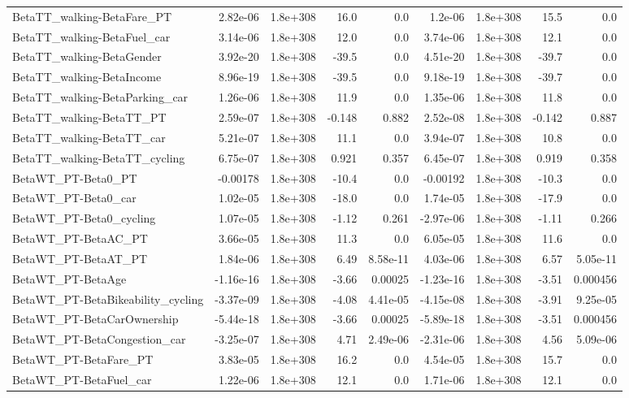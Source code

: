 \begin{tabular}{lrrrrrrrr}
BetaTT_walking-BetaFare_PT & 2.82e-06 & 1.8e+308 & 16.0 & 0.0 & 1.2e-06 & 1.8e+308 & 15.5 & 0.0 \\
BetaTT_walking-BetaFuel_car & 3.14e-06 & 1.8e+308 & 12.0 & 0.0 & 3.74e-06 & 1.8e+308 & 12.1 & 0.0 \\
BetaTT_walking-BetaGender & 3.92e-20 & 1.8e+308 & -39.5 & 0.0 & 4.51e-20 & 1.8e+308 & -39.7 & 0.0 \\
BetaTT_walking-BetaIncome & 8.96e-19 & 1.8e+308 & -39.5 & 0.0 & 9.18e-19 & 1.8e+308 & -39.7 & 0.0 \\
BetaTT_walking-BetaParking_car & 1.26e-06 & 1.8e+308 & 11.9 & 0.0 & 1.35e-06 & 1.8e+308 & 11.8 & 0.0 \\
BetaTT_walking-BetaTT_PT & 2.59e-07 & 1.8e+308 & -0.148 & 0.882 & 2.52e-08 & 1.8e+308 & -0.142 & 0.887 \\
BetaTT_walking-BetaTT_car & 5.21e-07 & 1.8e+308 & 11.1 & 0.0 & 3.94e-07 & 1.8e+308 & 10.8 & 0.0 \\
BetaTT_walking-BetaTT_cycling & 6.75e-07 & 1.8e+308 & 0.921 & 0.357 & 6.45e-07 & 1.8e+308 & 0.919 & 0.358 \\
BetaWT_PT-Beta0_PT & -0.00178 & 1.8e+308 & -10.4 & 0.0 & -0.00192 & 1.8e+308 & -10.3 & 0.0 \\
BetaWT_PT-Beta0_car & 1.02e-05 & 1.8e+308 & -18.0 & 0.0 & 1.74e-05 & 1.8e+308 & -17.9 & 0.0 \\
BetaWT_PT-Beta0_cycling & 1.07e-05 & 1.8e+308 & -1.12 & 0.261 & -2.97e-06 & 1.8e+308 & -1.11 & 0.266 \\
BetaWT_PT-BetaAC_PT & 3.66e-05 & 1.8e+308 & 11.3 & 0.0 & 6.05e-05 & 1.8e+308 & 11.6 & 0.0 \\
BetaWT_PT-BetaAT_PT & 1.84e-06 & 1.8e+308 & 6.49 & 8.58e-11 & 4.03e-06 & 1.8e+308 & 6.57 & 5.05e-11 \\
BetaWT_PT-BetaAge & -1.16e-16 & 1.8e+308 & -3.66 & 0.00025 & -1.23e-16 & 1.8e+308 & -3.51 & 0.000456 \\
BetaWT_PT-BetaBikeability_cycling & -3.37e-09 & 1.8e+308 & -4.08 & 4.41e-05 & -4.15e-08 & 1.8e+308 & -3.91 & 9.25e-05 \\
BetaWT_PT-BetaCarOwnership & -5.44e-18 & 1.8e+308 & -3.66 & 0.00025 & -5.89e-18 & 1.8e+308 & -3.51 & 0.000456 \\
BetaWT_PT-BetaCongestion_car & -3.25e-07 & 1.8e+308 & 4.71 & 2.49e-06 & -2.31e-06 & 1.8e+308 & 4.56 & 5.09e-06 \\
BetaWT_PT-BetaFare_PT & 3.83e-05 & 1.8e+308 & 16.2 & 0.0 & 4.54e-05 & 1.8e+308 & 15.7 & 0.0 \\
BetaWT_PT-BetaFuel_car & 1.22e-06 & 1.8e+308 & 12.1 & 0.0 & 1.71e-06 & 1.8e+308 & 12.1 & 0.0 \\

\end{tabular}
